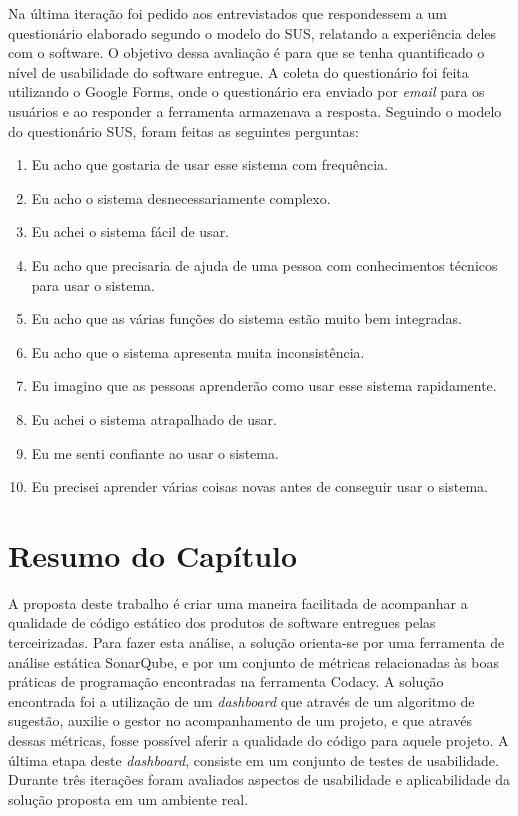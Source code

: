 Na última iteração foi pedido aos entrevistados que respondessem a um questionário elaborado segundo o modelo do SUS, relatando a experiência deles com o software. O objetivo dessa avaliação é para que se tenha quantificado o nível de usabilidade do software entregue. A coleta do questionário foi feita utilizando o Google Forms, onde o questionário era enviado por \textit{email} para os usuários e ao responder a ferramenta armazenava a resposta. Seguindo o modelo do questionário SUS, foram feitas as seguintes perguntas:

\begin{enumerate}
\item Eu acho que gostaria de usar esse sistema com frequência.
\item Eu acho o sistema desnecessariamente complexo.
\item Eu achei o sistema fácil de usar.
\item Eu acho que precisaria de ajuda de uma pessoa com conhecimentos técnicos para usar o sistema.
\item Eu acho que as várias funções do sistema estão muito bem integradas.
\item Eu acho que o sistema apresenta muita inconsistência.
\item Eu imagino que as pessoas aprenderão como usar esse sistema rapidamente.
\item Eu achei o sistema atrapalhado de usar.
\item Eu me senti confiante ao usar o sistema.
\item Eu precisei aprender várias coisas novas antes de conseguir usar o sistema.
\end{enumerate}

\section{Resumo do Capítulo}

A proposta deste trabalho é criar uma maneira facilitada de acompanhar a qualidade de código estático dos produtos de software entregues pelas terceirizadas. Para fazer esta análise, a solução orienta-se por uma ferramenta de análise estática SonarQube, e por um conjunto de métricas relacionadas às boas práticas de programação encontradas na ferramenta Codacy. A solução encontrada foi a utilização de um \textit{dashboard} que através de um algoritmo de sugestão, auxilie o gestor no acompanhamento de um projeto, e que através dessas métricas, fosse possível aferir a qualidade do código para aquele projeto. A última etapa deste \textit{dashboard}, consiste em um conjunto de testes de usabilidade. Durante três iterações foram avaliados aspectos de usabilidade e aplicabilidade da solução proposta em um ambiente real.